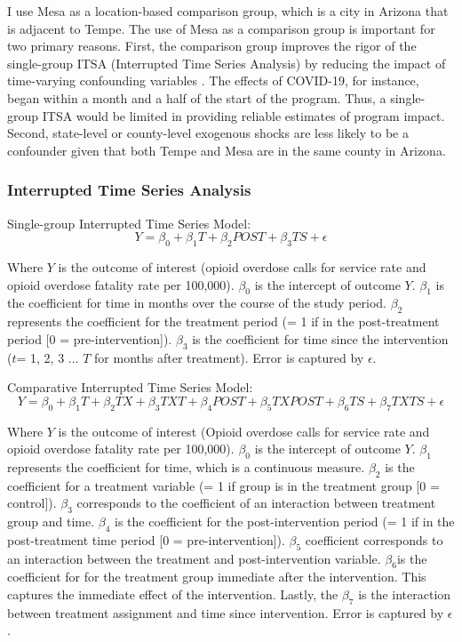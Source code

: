 I use Mesa as a location-based comparison group, which is a city in Arizona that is adjacent to Tempe. The use of Mesa as a comparison group is important for two primary reasons. First, the comparison group improves the rigor of the single-group ITSA (Interrupted Time Series Analysis) by reducing the impact of time-varying confounding variables \parencite{shadish_experimental_2002}. The effects of COVID-19, for instance, began within a month and a half of the start of the program. Thus, a single-group ITSA would be limited in providing reliable estimates of program impact. Second, state-level or county-level exogenous shocks are less likely to be a confounder given that both Tempe and Mesa are in the same county in Arizona.

\subsubsection{Interrupted Time Series Analysis}

Single-group Interrupted Time Series Model:
\[Y = \beta_0 + \beta_1 T + \beta_2 POST + \beta_3 TS + \epsilon \]

Where \(Y\) is the outcome of interest (opioid overdose calls for service rate and opioid overdose fatality rate per 100,000). \(\beta_0\) is the intercept of outcome \(Y\). \(\beta_1\) is the coefficient for time in months over the course of the study period. \(\beta_2\) represents the coefficient for the treatment period (= 1 if in the post-treatment period [0 = pre-intervention]). \(\beta_3\) is the coefficient for time since the intervention (\(t\)= 1, 2, 3 ... \(T\) for months after treatment). Error is captured by \(\epsilon\).

Comparative Interrupted Time Series Model:
\[Y = \beta_0 + \beta_1 T + \beta_2 TX + \beta_3 TXT + \beta_4 POST + \beta_5 TXPOST + \beta_6 TS + \beta_7 TXTS + \epsilon \]

Where \(Y\) is the outcome of interest (Opioid overdose calls for service rate and opioid overdose fatality rate per 100,000). \(\beta_0\) is the intercept of outcome \(Y\). \(\beta_1\) represents the coefficient for time, which is a continuous measure. \(\beta_2\) is the coefficient for a treatment variable (= 1 if group is in the treatment group [0 = control]). \(\beta_3\) corresponds to the coefficient of an interaction between treatment group and time. \(\beta_4\) is the coefficient for the post-intervention period (= 1 if in the post-treatment time period [0 = pre-intervention]). \(\beta_5\) coefficient corresponds to an interaction between the treatment and post-intervention variable. \(\beta_6\)is the coefficient for for the treatment group immediate after the intervention. This captures the immediate effect of the intervention. Lastly, the \(\beta_7\) is the interaction between treatment assignment and time since intervention. Error is captured by \(\epsilon\).


